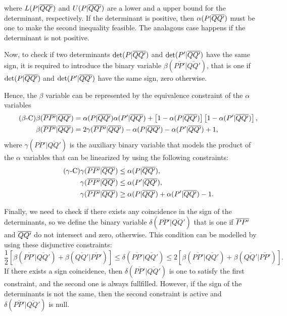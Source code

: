 \documentclass[a4paper]{elsarticle}
\begin{document}
where $L(P|\overline{QQ'})$ and $U(P|\overline{QQ'})$ are a lower and a upper bound for the determinant, respectively. If the determinant is positive, then $\alpha(P|\overline{QQ'})$ must be one to make the second inequality feasible. The analagous case happens if the determinant is not positive.

\newcommand{\betamas}[4]{\beta(\overline{#1#2}|\overline{#3#4})}

Now, to check if two determinants $\det({P|\overline{QQ'}})$ and $\det({P'|\overline{QQ'}})$ have the same sign, it is required to introduce the binary variable $\betamas{P}{P'}{Q}{Q'}$, that is one if $\det({P|\overline{QQ'}})$ and $\det({P'|\overline{QQ'}})$ have the same sign, zero otherwise.

\newcommand{\gammaprod}[4]{\gamma(\overline{#1#2}|\overline{#3#4})}

Hence, the $\beta$ variable can be represented by the equivalence constraint of the $\alpha$ variables
\begin{align*}\tag{$\beta$-C}\label{eq:betaC}
\betamas{P}{P'}{Q}{Q'}&=\alphamas{P}{Q}{Q'}\alphamas{P'}{Q}{Q'} + \left[1-\alphamas{P}{Q}{Q'}\right]\left[1-\alphamas{P'}{Q}{Q'}\right],\\
\betamas{P}{P'}{Q}{Q'}&=2\gammaprod{P}{P'}{Q}{Q'} -\alphamas{P}{Q}{Q'}-\alphamas{P'}{Q}{Q'}+1,
\end{align*}
where $\gammaprod{P}{P'}{Q}{Q'}$ is the auxiliary binary variable that models the product of the $\alpha$ variables that can be linearized by using the following constraints:
\begin{align*}\tag{$\gamma$-C}\label{eq:gammaC}
\gammaprod{P}{P'}{Q}{Q'} & \leq \alphamas{P}{Q}{Q'},\\
\gammaprod{P}{P'}{Q}{Q'} & \leq \alphamas{P'}{Q}{Q'},\\
\gammaprod{P}{P'}{Q}{Q'} & \geq \alphamas{P}{Q}{Q'} + \alphamas{P'}{Q}{Q'} - 1.
\end{align*}
 

\newcommand{\deltacheck}[4]{\delta(\overline{#1#2}|\overline{#3#4})}

Finally, we need to check if there exists any coincidence in the sign of the determinants, so we define the binary variable $\deltacheck{P}{P'}{Q}{Q'}$ that is one if $\overline{PP'}$ and $\overline{QQ'}$ do not intersect and zero, otherwise. This condition can be modelled by using these disjunctive constraints:
\begin{equation*}\tag{$\delta$-C}\label{eq:deltaC}
\frac{1}{2}\left[\betamas{P}{P'}{Q}{Q'}+\betamas{Q}{Q'}{P}{P'}\right]\leq\deltacheck{P}{P'}{Q}{Q'}\leq 2\left[\betamas{P}{P'}{Q}{Q'}+\betamas{Q}{Q'}{P}{P'}\right].
\end{equation*}
If there exists a sign coincidence, then $\deltacheck{P}{P'}{Q}{Q'}$ is one to satisfy the first constraint, and the second one is always fullfilled. However, if the sign of the determinants is not the same, then the second constraint is active and $\deltacheck{P}{P'}{Q}{Q'}$ is null.
\end{document}
